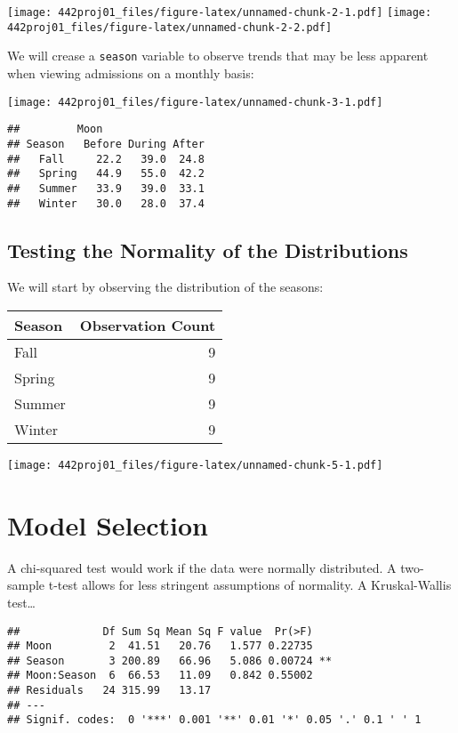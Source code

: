 \documentclass[
]{article}
\begin{document}
\texttt{[image: 442proj01\_files/figure-latex/unnamed-chunk-2-1.pdf]}
\texttt{[image: 442proj01\_files/figure-latex/unnamed-chunk-2-2.pdf]}

We will crease a \texttt{season} variable to observe trends that may be
less apparent when viewing admissions on a monthly basis:

\texttt{[image: 442proj01\_files/figure-latex/unnamed-chunk-3-1.pdf]}

\begin{verbatim}
##         Moon
## Season   Before During After
##   Fall     22.2   39.0  24.8
##   Spring   44.9   55.0  42.2
##   Summer   33.9   39.0  33.1
##   Winter   30.0   28.0  37.4
\end{verbatim}

\subsection{Testing the Normality of the
Distributions}\label{testing-the-normality-of-the-distributions}

We will start by observing the distribution of the seasons:

\begin{longtable}[]{@{}lr@{}}
\toprule\noalign{}
Season & Observation Count \\
\midrule\noalign{}
\endhead
\bottomrule\noalign{}
\endlastfoot
Fall & 9 \\
Spring & 9 \\
Summer & 9 \\
Winter & 9 \\
\end{longtable}

\texttt{[image: 442proj01\_files/figure-latex/unnamed-chunk-5-1.pdf]}

\section{Model Selection}\label{model-selection}

A chi-squared test would work if the data were normally distributed. A
two-sample t-test allows for less stringent assumptions of normality. A
Kruskal-Wallis test\ldots{}

\begin{verbatim}
##             Df Sum Sq Mean Sq F value  Pr(>F)   
## Moon         2  41.51   20.76   1.577 0.22735   
## Season       3 200.89   66.96   5.086 0.00724 **
## Moon:Season  6  66.53   11.09   0.842 0.55002   
## Residuals   24 315.99   13.17                   
## ---
## Signif. codes:  0 '***' 0.001 '**' 0.01 '*' 0.05 '.' 0.1 ' ' 1
\end{verbatim}
\end{document}
